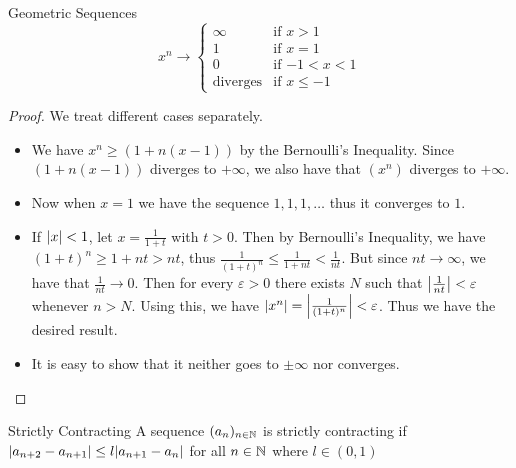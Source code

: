 \documentclass[a4paper]{article}
\begin{document}
\begin{thm}{Geometric Sequences}{} $$x^n\to\begin{cases}
\infty & \text{if $x>1$} \\
1 & \text{if $x=1$} \\
0 & \text{if $-1<x<1$} \\
\text{diverges} & \text{if $x\leq-1$}
\end{cases}$$\tcbline
\begin{proof} We treat different cases separately. 
\begin{itemize}
\item We have $x^n\geq(1+n(x-1))$ by the Bernoulli's Inequality. Since $(1+n(x-1))$ diverges to $+\infty$, we also have that $(x^n)$ diverges to $+\infty$. 
\item Now when $x=1$ we have the sequence $1,1,1,\dots$ thus it converges to $1$. 
\item If $\abs{x}<1$, let $x=\frac{1}{1+t}$ with $t>0$. Then by Bernoulli's Inequality, we have $(1+t)^n\geq1+nt>nt$, thus $\frac{1}{(1+t)^n}\leq\frac{1}{1+nt}<\frac{1}{nt}$. But since $nt\to\infty$, we have that $\frac{1}{nt}\to 0$. Then for every $\varepsilon>0$ there exists $N$ such that $\abs{\frac{1}{nt}}<\varepsilon$ whenever $n>N$. Using this, we have $\abs{x^n}=\abs{\frac{1}{(1+t)^n}}<\varepsilon$. Thus we have the desired result. 
\item It is easy to show that it neither goes to $\pm\infty$ nor converges. 
\end{itemize}
\end{proof}
\end{thm}

\begin{defn}{Strictly Contracting}{} A sequence $(a_n)_{n\in\mathbb{N}}$ is strictly contracting if $\abs{a_{n+2}-a_{n+1}}\leq l\abs{a_{n+1}-a_n}$ for all $n\in\mathbb{N}$ where $l\in(0,1)$
\end{defn}
\end{document}
